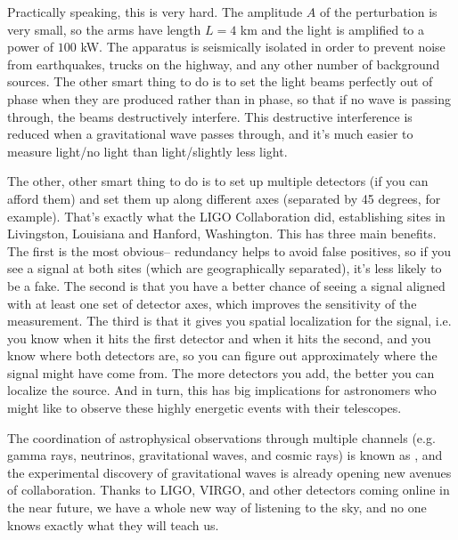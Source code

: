 Practically speaking, this is very hard. The amplitude $A$ of the perturbation is very small, so the arms have length $L=4$ km and the light is amplified to a power of $100$ kW. The apparatus is seismically isolated in order to prevent noise from earthquakes, trucks on the highway, and any other number of background sources. The other smart thing to do is to set the light beams perfectly out of phase when they are produced rather than in phase, so that if no wave is passing through, the beams destructively interfere. This destructive interference is reduced when a gravitational wave passes through, and it's much easier to measure light/no light than light/slightly less light. 

The other, other smart thing to do is to set up multiple detectors (if you can afford them) and set them up along different axes (separated by 45 degrees, for example). That's exactly what the LIGO Collaboration did, establishing sites in Livingston, Louisiana and Hanford, Washington. This has three main benefits. The first is the most obvious-- redundancy helps to avoid false positives, so if you see a signal at both sites (which are geographically separated), it's less likely to be a fake. The second is that you have a better chance of seeing a signal aligned with at least one set of detector axes, which improves the sensitivity of the measurement. The third is that it gives you spatial localization for the signal, i.e. you know when it hits the first detector and when it hits the second, and you know where both detectors are, so you can figure out approximately where the signal might have come from. The more detectors you add, the better you can localize the source. And in turn, this has big implications for astronomers who might like to observe these highly energetic events with their telescopes.

The coordination of astrophysical observations through multiple channels (e.g. gamma rays, neutrinos, gravitational waves, and cosmic rays) is known as , and the experimental discovery of gravitational waves is already opening new avenues of collaboration. Thanks to LIGO, VIRGO, and other detectors coming online in the near future, we have a whole new way of listening to the sky, and no one knows exactly what they will teach us.